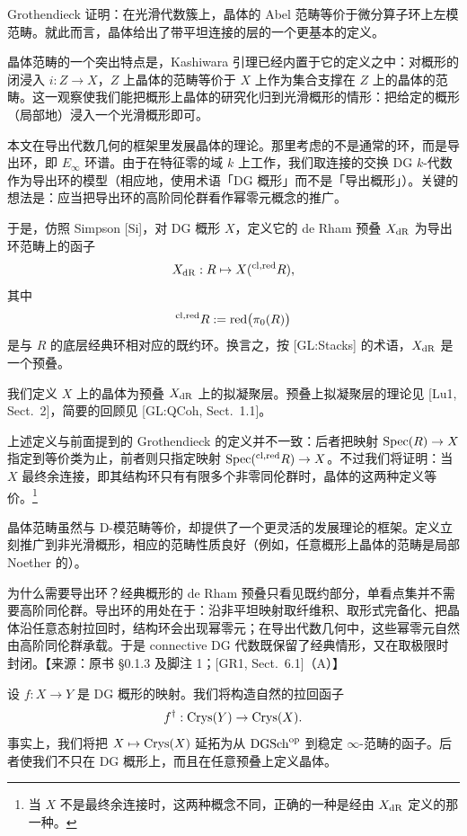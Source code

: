 Grothendieck 证明：在光滑代数簇上，晶体的 Abel 范畴等价于微分算子环上左模范畴。就此而言，晶体给出了带平坦连接的层的一个更基本的定义。

晶体范畴的一个突出特点是，Kashiwara 引理已经内置于它的定义之中：对概形的闭浸入 $i:Z\to X$，$Z$ 上晶体的范畴等价于 $X$ 上作为集合支撑在 $Z$ 上的晶体的范畴。这一观察使我们能把概形上晶体的研究化归到光滑概形的情形：把给定的概形（局部地）浸入一个光滑概形即可。

本文在导出代数几何的框架里发展晶体的理论。那里考虑的不是通常的环，而是导出环，即 $E_\infty$ 环谱。由于在特征零的域 $k$ 上工作，我们取连接的交换 DG $k$-代数作为导出环的模型（相应地，使用术语「DG 概形」而不是「导出概形」）。关键的想法是：应当把导出环的高阶同伦群看作幂零元概念的推广。

于是，仿照 Simpson [Si]，对 DG 概形 $X$，定义它的 de Rham 预叠 $X_{\mathrm{dR}}$ 为导出环范畴上的函子
\[
X_{\mathrm{dR}}:R\mapsto X(^{\mathrm{cl,red}} R),
\]
其中
\[
^{\mathrm{cl,red}} R:=\mathrm{red}\big(\pi_0(R)\big)
\]
是与 $R$ 的底层经典环相对应的既约环。换言之，按 [GL:Stacks] 的术语，$X_{\mathrm{dR}}$ 是一个预叠。

我们定义 $X$ 上的晶体为预叠 $X_{\mathrm{dR}}$ 上的拟凝聚层。预叠上拟凝聚层的理论见 [Lu1, Sect.~2]，简要的回顾见 [GL:QCoh, Sect.~1.1]。

上述定义与前面提到的 Grothendieck 的定义并不一致：后者把映射 $\mathrm{Spec}(R)\to X$ 指定到等价类为止，前者则只指定映射 $\mathrm{Spec}(^{\mathrm{cl,red}} R)\to X$。不过我们将证明：当 $X$ 最终余连接，即其结构环只有有限多个非零同伦群时，晶体的这两种定义等价。\footnote{当 $X$ 不是最终余连接时，这两种概念不同，正确的一种是经由 $X_{\mathrm{dR}}$ 定义的那一种。}

晶体范畴虽然与 D-模范畴等价，却提供了一个更灵活的发展理论的框架。定义立刻推广到非光滑概形，相应的范畴性质良好（例如，任意概形上晶体的范畴是局部 Noether 的）。

\begin{annote}
为什么需要导出环？经典概形的 de Rham 预叠只看见既约部分，单看点集并不需要高阶同伦群。导出环的用处在于：沿非平坦映射取纤维积、取形式完备化、把晶体沿任意态射拉回时，结构环会出现幂零元；在导出代数几何中，这些幂零元自然由高阶同伦群承载。于是 connective DG 代数既保留了经典情形，又在取极限时封闭。\hfill【来源：原书 §0.1.3 及脚注 1；[GR1, Sect.~6.1]（A）】
\end{annote}


设 $f:X\to Y$ 是 DG 概形的映射。我们将构造自然的拉回函子
\[
f^\dagger:\mathrm{Crys}(Y)\to\mathrm{Crys}(X).
\]
事实上，我们将把 $X\mapsto\mathrm{Crys}(X)$ 延拓为从 $\mathrm{DGSch}^{\mathrm{op}}$ 到稳定 $\infty$-范畴的函子。后者使我们不只在 DG 概形上，而且在任意预叠上定义晶体。

